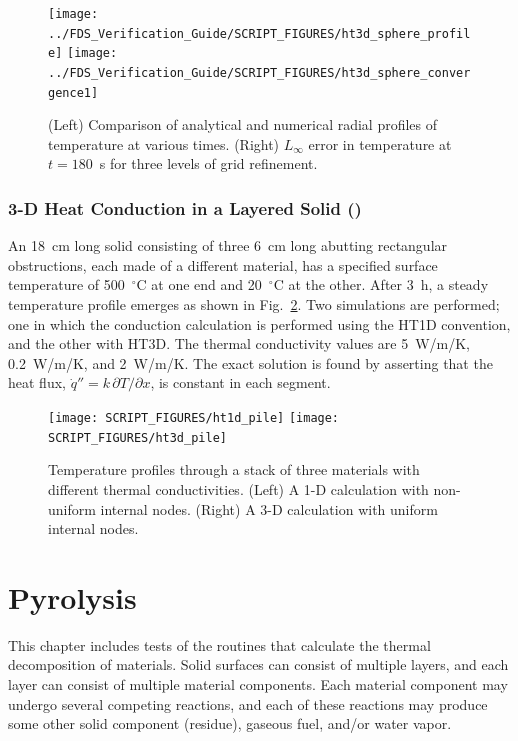 \documentclass[11pt]{book}
\begin{document}
\begin{figure}[ht]
\centering
\texttt{[image: ../FDS\_Verification\_Guide/SCRIPT\_FIGURES/ht3d\_sphere\_profile]}
\texttt{[image: ../FDS\_Verification\_Guide/SCRIPT\_FIGURES/ht3d\_sphere\_convergence1]}
\caption[The  temperature profiles and convergence rate]{(Left) Comparison of analytical and numerical radial profiles of temperature at various times. (Right) $L_{\infty}$ error in temperature at $t=180$~s for three levels of grid refinement.}
\label{fig:ht3d_sphere_time}
\end{figure}


\FloatBarrier

\subsection{3-D Heat Conduction in a Layered Solid (\texorpdfstring{}{ht1d\_pile})}
\label{ht1d_pile}
\label{ht3d_pile}

An 18~cm long solid consisting of three 6~cm long abutting rectangular obstructions, each made of a different material, has a specified surface temperature of 500~$^\circ$C at one end and 20~$^\circ$C at the other. After 3~h, a steady temperature profile emerges as shown in Fig.~\ref{fig:ht3d_pile}. Two simulations are performed; one in which the conduction calculation is performed using the {\ct HT1D} convention, and the other with {\ct HT3D}. The thermal conductivity values are 5~W/m/K, 0.2~W/m/K, and 2~W/m/K. The exact solution is found by asserting that the heat flux, $\dot{q}''=k \, \partial T / \partial x$, is constant in each segment.

\begin{figure}[ht]
\texttt{[image: SCRIPT\_FIGURES/ht1d\_pile]}
\texttt{[image: SCRIPT\_FIGURES/ht3d\_pile]}
\caption[The  and  test cases]{Temperature profiles through a stack of three materials with different thermal conductivities. (Left) A 1-D calculation with non-uniform internal nodes. (Right) A 3-D calculation with uniform internal nodes.}
\label{fig:ht3d_pile}
\end{figure}



\chapter{Pyrolysis}

This chapter includes tests of the routines that calculate the thermal decomposition of materials. Solid surfaces can consist of multiple layers, and each layer can consist of multiple material components. Each material component may undergo several competing reactions, and each of these reactions may produce some other solid component (residue), gaseous fuel, and/or water vapor.
\end{document}
